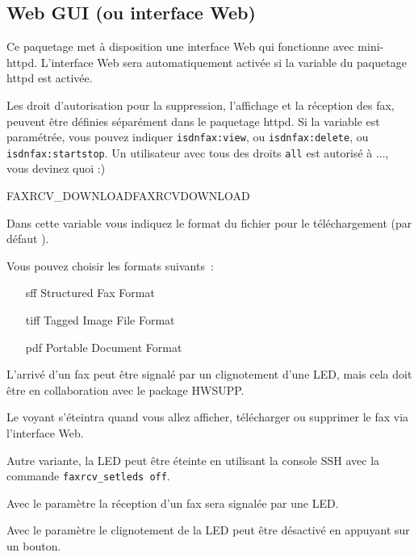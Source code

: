 \subsection {Web GUI (ou interface Web)}

    Ce paquetage met à disposition une interface Web qui fonctionne avec mini-httpd.
    L'interface Web sera automatiquement activée si la variable 
	du paquetage httpd est activée.

    Les droit d'autorisation pour la suppression, l'affichage et la réception des fax, peuvent
	être définies séparément dans le paquetage httpd. Si la variable  est
	paramétrée, vous pouvez indiquer \verb?isdnfax:view?, ou \verb?isdnfax:delete?, ou \verb?isdnfax:startstop?.
	Un utilisateur avec tous des droits \verb?all? est autorisé à ..., vous devinez quoi :)

\begin{description}

     {FAXRCV\_DOWNLOAD}{FAXRCVDOWNLOAD}

    Dans cette variable vous indiquez le format du fichier pour le téléchargement
	(par défaut ).

    Vous pouvez choisir les formats suivants~:
    \begin{itemize}
        \item[sff] Structured Fax Format
        \item[tiff] Tagged Image File Format
        \item[pdf] Portable Document Format
    \end{itemize}

\end{description}

    L'arrivé d'un fax peut être signalé par un clignotement d'une LED, mais cela doit être
	en collaboration avec le package HWSUPP.

	Le voyant s'éteintra quand vous allez afficher, télécharger ou supprimer le fax via
	l'interface Web.

	Autre variante, la LED peut être éteinte en utilisant la console SSH avec la commande
	\texttt{faxrcv\_setleds off}.

\begin{description}


	Avec le paramètre  la réception d'un fax sera signalée
	par une LED.


	Avec le paramètre  le clignotement de la LED peut
	être désactivé en appuyant sur un bouton.

\end{description}


